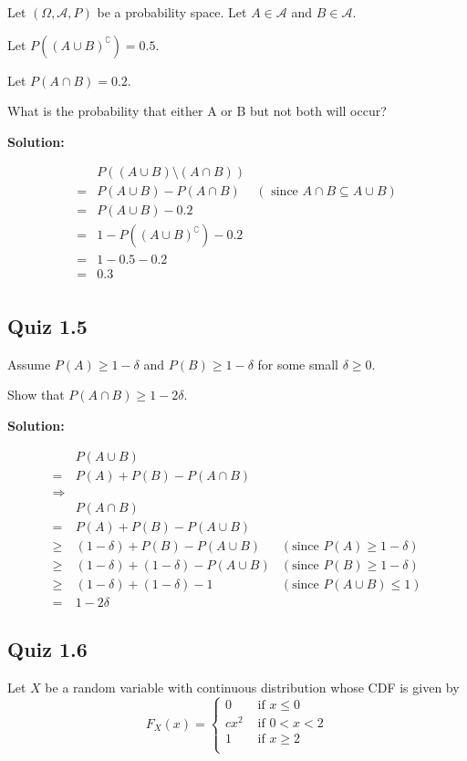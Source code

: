\documentclass{article}
\begin{document}
Let \((\Omega, \mathcal{A}, P)\) be a probability space.
Let \(A\in \mathcal{A}\) and \(B\in \mathcal{A}\).

Let \(P((A\cup B)^\complement)=0.5\).

Let \(P(A\cap B)=0.2\).

What is the probability that either A or B but not both will occur?

\textbf{Solution:}

\begin{align*}
	 & P((A\cup B)\setminus(A\cap B)) \\
	=& P(A\cup B)-P(A\cap B) & (\text{ since }A\cap B \subseteq A\cup B) \\
	=& P(A\cup B)-0.2 \\
	=& 1-P((A \cup B)^\complement)-0.2 \\
	=& 1-0.5-0.2 \\
	=& 0.3 \\
\end{align*}

\subsection{Quiz 1.5}

Assume
\(P(A) \geq 1-\delta\) and \(P(B) \geq 1-\delta\) for some small \(\delta\geq0\).

Show that \(P(A\cap B) \geq 1-2\delta\).

\textbf{Solution:}

\begin{align*}
	 & P(A\cup B) \\
	=& P(A)+P(B)-P(A\cap B) \\
	\Rightarrow& \\
	 & P(A\cap B) \\
	=& P(A)+P(B)-P(A\cup B) \\
	\geq& (1-\delta)+P(B)-P(A\cup B) & (\text{since }P(A) \geq 1-\delta) \\
	\geq& (1-\delta)+(1-\delta)-P(A\cup B) & (\text{since }P(B) \geq 1-\delta) \\
	\geq& (1-\delta)+(1-\delta)-1 & (\text{since }P(A\cup B) \leq 1) \\
	=& 1-2\delta
\end{align*}

\subsection{Quiz 1.6}

Let \(X\) be a random variable with continuous distribution whose CDF is given by
\[F_X(x) = \begin{cases}
	0 &\text{ if } x\leq 0 \\
	cx^2 &\text{ if } 0<x<2 \\
	1 &\text{ if } x \geq 2 \\
\end{cases}\]
\end{document}
